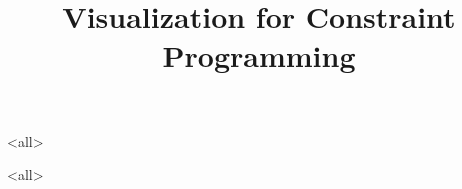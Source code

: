 \title[Visualization] %
{Visualization for Constraint Programming}

\subtitle
{} %



\mode<all>{

}
\mode<all>{

}


